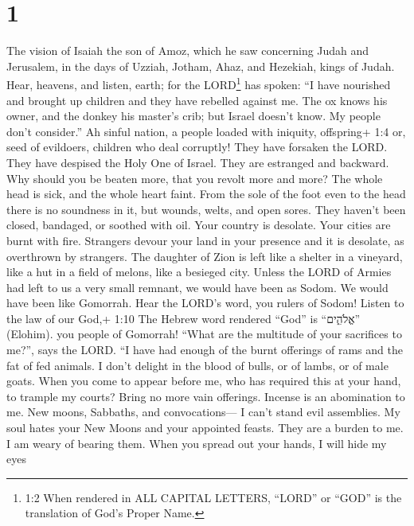 \hypertarget{section}{%
\section{1}\label{section}}

 The vision of Isaiah the son of Amoz, which he saw
concerning Judah and Jerusalem, in the days of Uzziah, Jotham, Ahaz, and
Hezekiah, kings of Judah.  Hear, heavens, and listen, earth;
for the LORD\footnote{1:2 When rendered in ALL CAPITAL LETTERS, ``LORD''
  or ``GOD'' is the translation of God's Proper Name.} has spoken: ``I
have nourished and brought up children and they have rebelled against
me.  The ox knows his owner, and the donkey his master's
crib; but Israel doesn't know. My people don't consider.'' 
Ah sinful nation, a people loaded with iniquity, offspring+ 1:4 or, seed
of evildoers, children who deal corruptly! They have forsaken the LORD.
They have despised the Holy One of Israel. They are estranged and
backward.  Why should you be beaten more, that you revolt
more and more? The whole head is sick, and the whole heart faint.
 From the sole of the foot even to the head there is no
soundness in it, but wounds, welts, and open sores. They haven't been
closed, bandaged, or soothed with oil.  Your country is
desolate. Your cities are burnt with fire. Strangers devour your land in
your presence and it is desolate, as overthrown by strangers.
 The daughter of Zion is left like a shelter in a vineyard,
like a hut in a field of melons, like a besieged city. 
Unless the LORD of Armies had left to us a very small remnant, we would
have been as Sodom. We would have been like Gomorrah.  Hear
the LORD's word, you rulers of Sodom! Listen to the law of our God,+
1:10 The Hebrew word rendered ``God'' is ``אֱלֹהִ֑ים'' (Elohim). you
people of Gomorrah!  ``What are the multitude of your
sacrifices to me?'', says the LORD. ``I have had enough of the burnt
offerings of rams and the fat of fed animals. I don't delight in the
blood of bulls, or of lambs, or of male goats.  When you
come to appear before me, who has required this at your hand, to trample
my courts?  Bring no more vain offerings. Incense is an
abomination to me. New moons, Sabbaths, and convocations--- I can't
stand evil assemblies.  My soul hates your New Moons and
your appointed feasts. They are a burden to me. I am weary of bearing
them.  When you spread out your hands, I will hide my eyes
